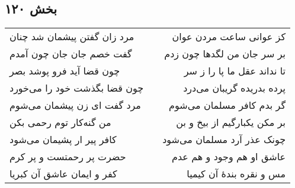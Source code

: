 \begin{center}
\section*{بخش ۱۲۰}
\label{sec:sh120}
\begin{longtable}{l p{0.5cm} r}
مرد زان گفتن پیشمان شد چنان
&&
کز عوانی ساعت مردن عوان
\\
گفت خصم جان جان چون آمدم
&&
بر سر جان من لگدها چون زدم
\\
چون قضا آید فرو پوشد بصر
&&
تا نداند عقل ما پا را ز سر
\\
چون قضا بگذشت خود را می‌خورد
&&
پرده بدریده گریبان می‌درد
\\
مرد گفت ای زن پیشمان می‌شوم
&&
گر بدم کافر مسلمان می‌شوم
\\
من گنه‌کار توم رحمی بکن
&&
بر مکن یکبارگیم از بیخ و بن
\\
کافر پیر ار پشیمان می‌شود
&&
چونک عذر آرد مسلمان می‌شود
\\
حضرت پر رحمتست و پر کرم
&&
عاشق او هم وجود و هم عدم
\\
کفر و ایمان عاشق آن کبریا
&&
مس و نقره بندهٔ آن کیمیا
\\
\end{longtable}
\end{center}
